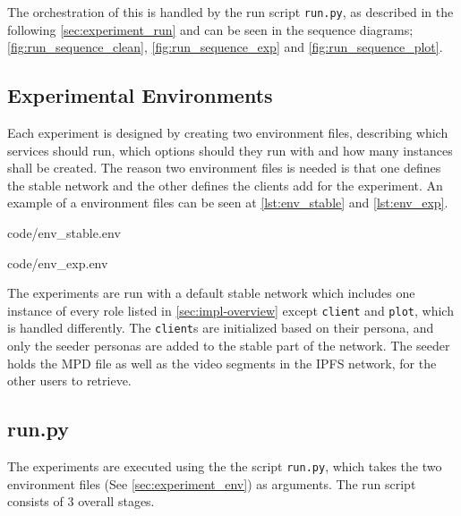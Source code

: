 The orchestration of this is handled by the run script \texttt{run.py}, as described in the following \autoref{sec:experiment_run} and can be seen in the sequence diagrams; \autoref{fig:run_sequence_clean}, \ref{fig:run_sequence_exp} and \ref{fig:run_sequence_plot}.

\subsection{Experimental Environments}
\label{sec:experiment_env}
Each experiment is designed by creating two environment files, describing which services should run, which options should they run with and how many instances shall be created. The reason two environment files is needed is that one defines the stable network and the other defines the clients add for the experiment. An example of a environment files can be seen at \autoref{lst:env_stable} and \ref{lst:env_exp}.

\noindent\begin{minipage}[t]{.35\textwidth}

                {code/env_stable.env}
\end{minipage}
\hfill
\begin{minipage}[t]{.52\textwidth}

                {code/env_exp.env}
\end{minipage}\bigskip

The experiments are run with a default stable network which includes one instance of every role listed in \autoref{sec:impl-overview} except \texttt{client} and \texttt{plot}, which is handled differently. The \texttt{client}s are initialized based on their persona, and only the seeder personas are added to the stable part of the network.
The seeder holds the \ac{MPD} file as well as the video segments in the \ac{IPFS} network, for the other users to retrieve. 

\subsection{run.py}
\label{sec:experiment_run}
The experiments are executed using the the script \texttt{run.py}, which takes the two environment files (See \autoref{sec:experiment_env}) as arguments. The run script consists of 3 overall stages.

